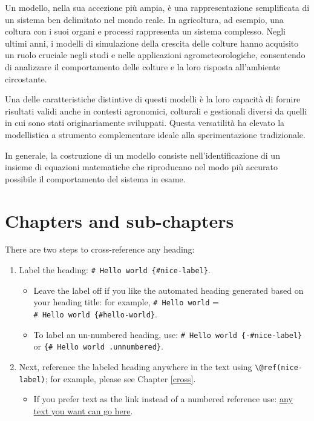 \documentclass[
]{book}
\providecommand{\tightlist}{%
  \setlength{\itemsep}{0pt}\setlength{\parskip}{0pt}}
\theoremstyle{definition}
\theoremstyle{definition}
\theoremstyle{definition}
\theoremstyle{definition}
\theoremstyle{remark}
\begin{document}
Un modello, nella sua accezione più ampia, è una rappresentazione semplificata di un sistema ben delimitato nel mondo reale. In agricoltura, ad esempio, una coltura con i suoi organi e processi rappresenta un sistema complesso. Negli ultimi anni, i modelli di simulazione della crescita delle colture hanno acquisito un ruolo cruciale negli studi e nelle applicazioni agrometeorologiche, consentendo di analizzare il comportamento delle colture e la loro risposta all'ambiente circostante.

Una delle caratteristiche distintive di questi modelli è la loro capacità di fornire risultati validi anche in contesti agronomici, colturali e gestionali diversi da quelli in cui sono stati originariamente sviluppati. Questa versatilità ha elevato la modellistica a strumento complementare ideale alla sperimentazione tradizionale.

In generale, la costruzione di un modello consiste nell'identificazione di un insieme di equazioni matematiche che riproducano nel modo più accurato possibile il comportamento del sistema in esame.

\hypertarget{chapters-and-sub-chapters}{%
\section{Chapters and sub-chapters}\label{chapters-and-sub-chapters}}

There are two steps to cross-reference any heading:

\begin{enumerate}
\def\labelenumi{\arabic{enumi}.}
\tightlist
\item
  Label the heading: \texttt{\#\ Hello\ world\ \{\#nice-label\}}.

  \begin{itemize}
  \tightlist
  \item
    Leave the label off if you like the automated heading generated based on your heading title: for example, \texttt{\#\ Hello\ world} = \texttt{\#\ Hello\ world\ \{\#hello-world\}}.
  \item
    To label an un-numbered heading, use: \texttt{\#\ Hello\ world\ \{-\#nice-label\}} or \texttt{\{\#\ Hello\ world\ .unnumbered\}}.
  \end{itemize}
\item
  Next, reference the labeled heading anywhere in the text using \texttt{\textbackslash{}@ref(nice-label)}; for example, please see Chapter \ref{cross}.

  \begin{itemize}
  \tightlist
  \item
    If you prefer text as the link instead of a numbered reference use: \protect\hyperlink{cross}{any text you want can go here}.
  \end{itemize}
\end{enumerate}
\end{document}
